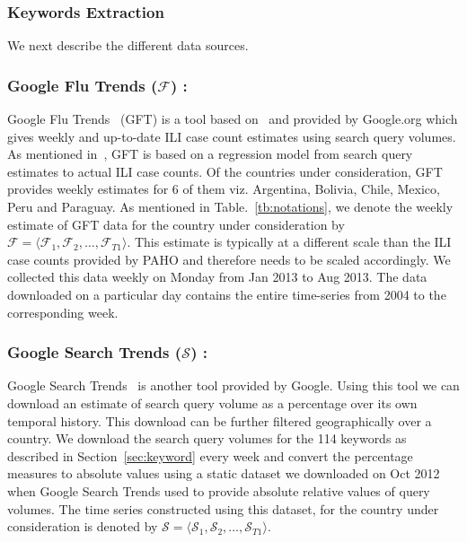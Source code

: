 \subsubsection{\label{sec:keyword} Keywords Extraction} 

We next describe the different data sources.

\subsubsection{Google Flu Trends ($\mathcal{F}$) :}
Google Flu Trends~\cite{GFT:2013} (GFT) is a tool based
on~\cite{ginsberg2008detecting} and provided by Google.org which gives weekly
and up-to-date ILI case count estimates using search query volumes. As
mentioned in~\cite{ginsberg2008detecting}, GFT is based on a regression model
from search query estimates to actual ILI case counts.  Of the countries under
consideration, GFT provides weekly estimates for 6 of them viz.  Argentina,
Bolivia, Chile, Mexico, Peru and Paraguay. As mentioned in
Table.~\ref{tb:notations}, we denote the weekly estimate of GFT data for the
country under consideration by $\mathcal{F} = \langle \mathcal{F}_1,
\mathcal{F}_2, \dots, \mathcal{F}_{T1} \rangle$. This estimate is typically at
a different scale than the ILI case counts provided by PAHO and therefore needs
to be scaled accordingly.  We collected this data weekly on Monday from Jan
2013 to Aug 2013. The data downloaded on a particular day contains the entire
time-series from 2004 to the corresponding week.  
 

\subsubsection{Google Search Trends ($\mathcal{S}$) :} Google Search Trends~\cite{GST:2013} is
another tool provided by Google. Using this tool we can download an estimate of
search query volume as a percentage over its own temporal history. This
download can be further filtered geographically over a country.  We download
the search query volumes for the 114 keywords as described in
Section~\ref{sec:keyword} every week and convert the percentage measures to
absolute values using a static dataset we downloaded on Oct 2012 when Google
Search Trends used to provide absolute relative values of query volumes. The
time series constructed using this dataset, for the country under consideration
is denoted by
$\mathcal{S} = \langle \mathcal{S}_1, \mathcal{S}_2, \dots, \mathcal{S}_{T1} \rangle$.

